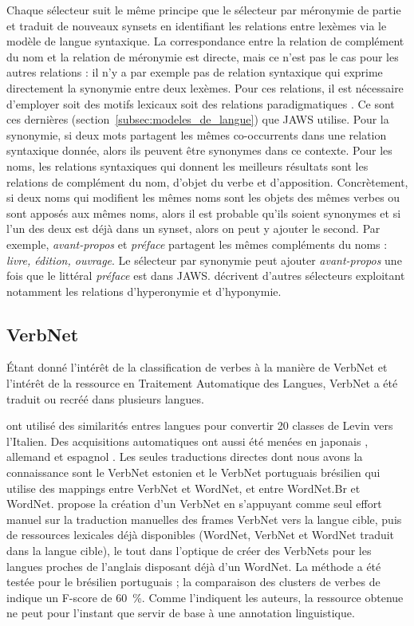 Chaque sélecteur suit le même principe que le sélecteur par méronymie de partie
et traduit de nouveaux synsets en identifiant les relations entre lexèmes via
le modèle de langue syntaxique. La correspondance entre la relation de
complément du nom et la relation de méronymie est directe, mais ce n'est pas le
cas pour les autres relations : il n'y a par exemple pas de relation syntaxique
qui exprime directement la synonymie entre deux lexèmes. Pour ces relations, il
est nécessaire d'employer soit des motifs lexicaux \citep{hearst1992automatic}
soit des relations paradigmatiques \citep{lenci2012identifying}. Ce sont ces
dernières (section~\ref{subsec:modeles_de_langue}) que JAWS utilise. Pour la
synonymie, si deux mots partagent les mêmes co-occurrents dans une relation
syntaxique donnée, alors ils peuvent être synonymes dans ce contexte. Pour les
noms, les relations syntaxiques qui donnent les meilleurs résultats sont les
relations de complément du nom, d'objet du verbe et d'apposition. Concrètement,
si deux noms qui modifient les mêmes noms sont les objets des mêmes verbes ou
sont apposés aux mêmes noms, alors il est probable qu'ils soient synonymes et
si l'un des deux est déjà dans un synset, alors on peut y ajouter le second.
Par exemple, \textit{avant-propos} et \textit{préface} partagent les mêmes
compléments du noms : \textit{livre, édition, ouvrage}. Le sélecteur par
synonymie peut ajouter \textit{avant-propos} une fois que le littéral
\textit{préface} est dans JAWS. \citep{mouton2010jaws,mouton2010phd} décrivent
d'autres sélecteurs exploitant notamment les relations d'hyperonymie et
d'hyponymie.

\subsection{VerbNet}

Étant donné l'intérêt de la classification de verbes à la manière de VerbNet et
l'intérêt de la ressource en Traitement Automatique des Langues, VerbNet a été
traduit ou recréé dans plusieurs langues.

\cite{merlo2002multilingual} ont utilisé des similarités entres langues pour
convertir 20 classes de Levin vers l'Italien. Des acquisitions automatiques ont
aussi été menées en japonais \citep{suzuki2009classifying}, allemand
\citep{im2006experiments} et espagnol \citep{ferrer2004towards}. Les seules
traductions directes dont nous avons la connaissance sont le VerbNet estonien
\citep{jentson2014verbnet} et le VerbNet portuguais brésilien
\citep{scarton2012towards} qui utilise des mappings entre VerbNet et WordNet,
et entre WordNet.Br et WordNet. \cite{scarton2014using} propose la création
d'un VerbNet en s'appuyant comme seul effort manuel sur la traduction manuelles
des frames VerbNet vers la langue cible, puis de ressources lexicales déjà
disponibles (WordNet, VerbNet et WordNet traduit dans la langue cible), le tout
dans l'optique de créer des VerbNets pour les langues proches de l'anglais
disposant déjà d'un WordNet.  La méthode a été testée pour le brésilien
portuguais ; la comparaison des clusters de verbes de
\citep{scarton2012towards} indique un F-score de 60~\%.  Comme l'indiquent les
auteurs, la ressource obtenue ne peut pour l'instant que servir de base à une
annotation linguistique.

